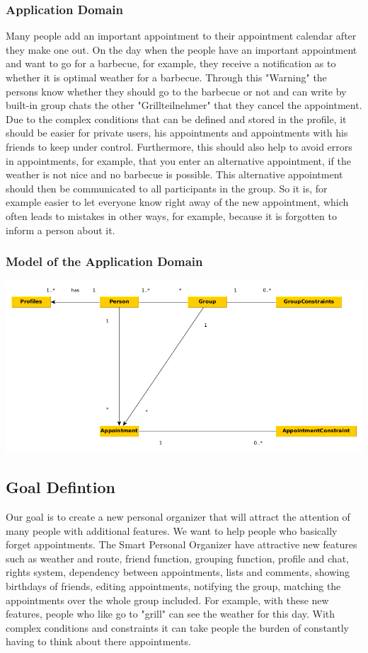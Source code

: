 \documentclass[12pt]{scrartcl}
\begin{document}
    \subsubsection{Application Domain}
        Many people add an important appointment to their appointment calendar after they make one out.
        On the day when the people have an important appointment and want to go for a barbecue, for example, they receive a notification as to whether it is optimal weather for a barbecue.
        Through this "Warning" the persons know whether they should go to the barbecue or not and can write by built-in group chats the other "Grillteilnehmer" that they cancel the appointment.
        Due to the complex conditions that can be defined and stored in the profile, it should be easier for private users, his appointments and appointments with his friends
        to keep under control. Furthermore, this should also help to avoid errors in appointments, for example, that you enter an alternative appointment, if
        the weather is not nice and no barbecue is possible. This alternative appointment should then be communicated to all participants in the group. So it is, for example
        easier to let everyone know right away of the new appointment, which often leads to mistakes in other ways, for example, because it is forgotten to inform a person about it.
        
    \subsubsection{Model of the Application Domain}
        \includegraphics[scale=.5]{Materials/Images/model_of_application_domain.png} 
    \subsection{Goal Defintion}
        Our goal is to create a new personal organizer that will attract the attention of many people with additional features.
        We want to help people who basically forget appointments. 
        The Smart Personal Organizer have attractive new features such as weather and route, friend function, grouping function, 
        profile and chat, rights system, dependency between appointments, lists and comments, showing birthdays of friends,
        editing appointments, notifying the group, matching the appointments over the whole group included.
        For example, with these new features, people who like go to "grill" can see the weather for this day.
        With complex conditions and constraints it can take people the burden of constantly having to think about there appointments.
\end{document}
